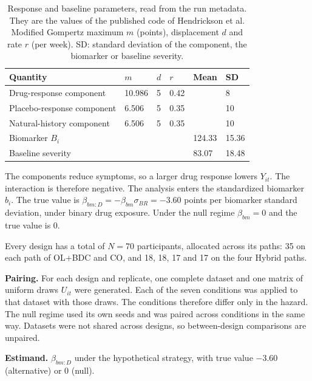 \documentclass[
  11pt,
]{article}
\begin{document}
\begin{table}
\centering
\caption{\label{tab:tab-params}Response and baseline parameters, read from the run metadata. They are the values of the published code of Hendrickson et al. Modified Gompertz maximum $m$ (points), displacement $d$ and rate $r$ (per week). SD: standard deviation of the component, the biomarker or baseline severity.}
\centering
\fontsize{9}{11}\selectfont
\begin{tabular}[t]{llllll}
\toprule
Quantity & $m$ & $d$ & $r$ & Mean & SD\\
\midrule
Drug-response component & 10.986 & 5 & 0.42 &  & 8\\
Placebo-response component & 6.506 & 5 & 0.35 &  & 10\\
Natural-history component & 6.506 & 5 & 0.35 &  & 10\\
Biomarker $B_i$ &  &  &  & 124.33 & 15.36\\
Baseline severity &  &  &  & 83.07 & 18.48\\
\bottomrule
\end{tabular}
\end{table}

The components reduce symptoms, so a larger drug response lowers
\(Y_{it}\). The interaction is therefore negative. The analysis enters
the standardized biomarker \(b_i\). The true value is
\(\beta_{bm:D} = -\beta_{bm}\sigma_{BR} = -3.60\) points per
biomarker standard deviation, under binary drug exposure. Under the
null regime \(\beta_{bm} = 0\) and the true value is 0.

Every design has a total of \(N = 70\) participants, allocated across
its paths: 35 on each path of OL+BDC and CO, and 18, 18, 17 and 17 on
the four Hybrid paths.

\textbf{Pairing.} For each design and replicate, one complete dataset and
one matrix of uniform draws \(U_{it}\) were generated. Each of the seven
conditions was applied to that dataset with those draws. The
conditions therefore differ only in the hazard. The null regime used
its own seeds and was paired across conditions in the same way.
Datasets were not shared across designs, so between-design
comparisons are unpaired.

\textbf{Estimand.} \(\beta_{bm:D}\) under the hypothetical strategy, with
true value \(-3.60\) (alternative) or 0 (null).
\end{document}
